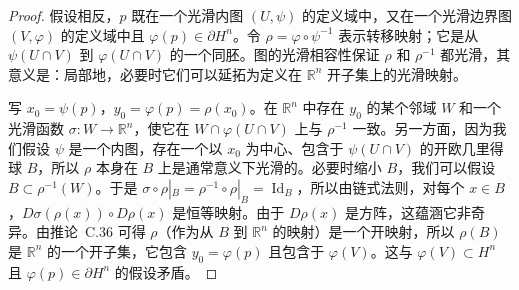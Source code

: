 \documentclass[../../main.tex]{subfiles}
\begin{document}
\begin{proof}
假设相反，$p$ 既在一个光滑内图 $(U,\psi)$ 的定义域中，又在一个光滑边界图 $(V,\varphi)$ 的定义域中且 $\varphi(p)\in\partial H^{n}$。令 $\rho=\varphi\circ\psi^{-1}$ 表示转移映射；它是从 $\psi(U\cap V)$ 到 $\varphi(U\cap V)$ 的一个同胚。图的光滑相容性保证 $\rho$ 和 $\rho^{-1}$ 都光滑，其意义是：局部地，必要时它们可以延拓为定义在 $\mathbb{R}^{n}$ 开子集上的光滑映射。

写 $x_{0}=\psi(p)$，$y_{0}=\varphi(p)=\rho(x_{0})$。在 $\mathbb{R}^{n}$ 中存在 $y_{0}$ 的某个邻域 $W$ 和一个光滑函数 $\sigma:W\to\mathbb{R}^{n}$，使它在 $W\cap\varphi(U\cap V)$ 上与 $\rho^{-1}$ 一致。另一方面，因为我们假设 $\psi$ 是一个内图，存在一个以 $x_{0}$ 为中心、包含于 $\psi(U\cap V)$ 的开欧几里得球 $B$，所以 $\rho$ 本身在 $B$ 上是通常意义下光滑的。必要时缩小 $B$，我们可以假设 $B\subset\rho^{-1}(W)$。于是 $\sigma\circ\rho|_{B}=\rho^{-1}\circ\rho|_{B}=\operatorname{Id}_{B}$，所以由链式法则，对每个 $x\in B$，$D\sigma(\rho(x))\circ D\rho(x)$ 是恒等映射。由于 $D\rho(x)$ 是方阵，这蕴涵它非奇异。由推论~C.36 可得 $\rho$（作为从 $B$ 到 $\mathbb{R}^{n}$ 的映射）是一个开映射，所以 $\rho(B)$ 是 $\mathbb{R}^{n}$ 的一个开子集，它包含 $y_{0}=\varphi(p)$ 且包含于 $\varphi(V)$。这与 $\varphi(V)\subset H^{n}$ 且 $\varphi(p)\in\partial H^{n}$ 的假设矛盾。
\end{proof}
\end{document}

